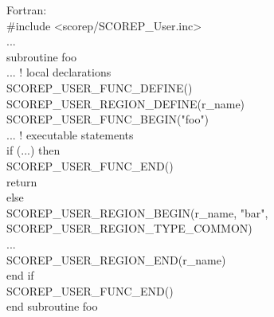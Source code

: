 \documentclass[a4paper]{article}
\begin{document}
    \begin{minipage}[t]{0.49\linewidth}
      Fortran: \\\ttfamily
      \#include <scorep/SCOREP\_User.inc> \\
      ... \\
      subroutine foo \\
      \hspace*{1ex} ... ! local declarations \\
      \hspace*{1ex} SCOREP\_USER\_FUNC\_DEFINE() \\
      \hspace*{1ex} SCOREP\_USER\_REGION\_DEFINE(r\_name) \\
      \hspace*{1ex} SCOREP\_USER\_FUNC\_BEGIN("foo") \\
      \hspace*{1ex} ... ! executable statements \\
      \hspace*{1ex} if (...) then \\
      \hspace*{2ex} SCOREP\_USER\_FUNC\_END() \\
      \hspace*{2ex} return \\
      \hspace*{1ex} else \\
      \hspace*{1ex} SCOREP\_USER\_REGION\_BEGIN(r\_name, "bar", \\
      \hspace*{9ex} SCOREP\_USER\_REGION\_TYPE\_COMMON) \\
      \hspace*{1ex} ... \\
      \hspace*{2ex} SCOREP\_USER\_REGION\_END(r\_name) \\
      \hspace*{1ex} end if \\
      \hspace*{1ex} SCOREP\_USER\_FUNC\_END() \\
      end subroutine foo
    \end{minipage}
\end{document}
